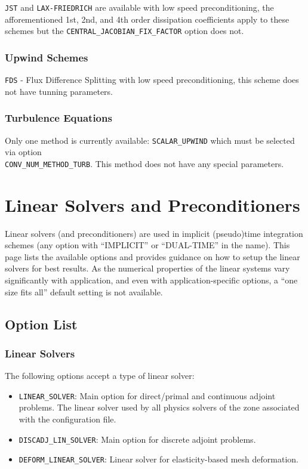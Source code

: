 \documentclass[12pt, a4paper, twoside]{article}
\begin{document}
\verb|JST| and \verb|LAX-FRIEDRICH| are available with low speed preconditioning, the afforementioned 1st, 2nd, and 4th order dissipation coefficients apply to these schemes but the \verb|CENTRAL_JACOBIAN_FIX_FACTOR| option does not.

\subsubsection{Upwind Schemes}

\verb|FDS| - Flux Difference Splitting with low speed preconditioning, this scheme does not have tunning parameters.

\subsubsection{Turbulence Equations}

Only one method is currently available: \verb|SCALAR_UPWIND| which must be selected via option \\ \verb|CONV_NUM_METHOD_TURB|. This method does not have any special parameters.




\newpage
\section{Linear Solvers and Preconditioners}
Linear solvers (and preconditioners) are used in implicit (pseudo)time integration schemes (any option with “IMPLICIT” or “DUAL-TIME” in the name). This page lists the available options and provides guidance on how to setup the linear solvers for best results. As the numerical properties of the linear systems vary significantly with application, and even with application-specific options, a “one size fits all” default setting is not available.

\subsection{Option List}
\subsubsection{Linear Solvers}
The following options accept a type of linear solver:

\begin{itemize}
    \item \verb|LINEAR_SOLVER|: Main option for direct/primal and continuous adjoint problems. The linear solver used by all physics solvers of the zone associated with the configuration file.
    \item \verb|DISCADJ_LIN_SOLVER|: Main option for discrete adjoint problems.
    \item \verb|DEFORM_LINEAR_SOLVER|: Linear solver for elasticity-based mesh deformation.
    
\end{itemize}
\end{document}
